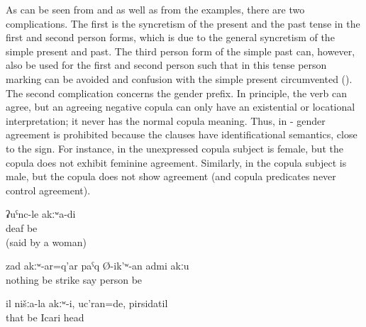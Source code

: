 As can be seen from  and  as well as from the examples, there are two complications. The first is the syncretism of the present and the past tense in the first and second person forms, which is due to the general syncretism of the simple present and past. The third person form of the simple past can, however, also be used for the first and second person such that in this tense person marking can be avoided and confusion with the simple present circumvented (). The second complication concerns the gender prefix. In principle, the verb can agree, but an agreeing negative copula can only have an existential or locational interpretation; it never has the normal copula meaning. Thus, in - gender agreement is prohibited because the clauses have identificational semantics, close to the \tit{=} sign. For instance, in  the unexpressed copula subject is female, but the copula does not exhibit feminine agreement. Similarly, in  the copula subject is male, but the copula does not show agreement (and copula predicates never control agreement).
%
\begin{exe}
	\ex	\label{ex:I am not deaf}
	\gll	ʡuˁnc-le	akːʷa-di\\
		deaf	be\\
	\glt	{} (said by a woman)

	\ex	\label{ex:He is not the person who beats without anything}
	\gll	zad	akːʷ-ar=q'ar	paˁq	Ø-ik'ʷ-an	admi	akːu\\
		nothing	be	strike	say	person	be\\
	\glt	{}

	\ex	\label{ex:He was not one of us, he was Icari, the head (of the kolkhoz)}
	\gll	il	nišːa-la	akːʷ-i,		uc'ran=de,	pirsidatil\\
		that		be		Icari	head\\
	\glt	{}
\end{exe}

